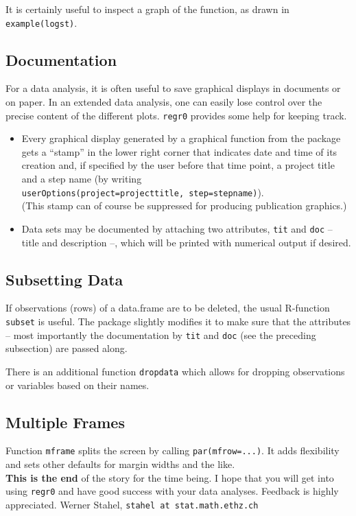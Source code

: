 \documentclass{article}
\providecommand{\T}{\texttt}
\providecommand{\Tit}[1]{\textbf{#1}\hspace{1em}}
\begin{document}
It is certainly useful to inspect a graph of the function, as drawn in 
\texttt{example(logst)}.


\subsection{Documentation}
For a data analysis, it is often useful to save graphical displays in 
documents or on paper. In an extended data analysis, one can easily lose
control over the precise content of the different plots.
\T{regr0} provides some help for keeping track.
\begin{itemize}
\item 
  Every graphical display generated by a graphical function from the
  package gets a ``stamp'' in the lower right corner that indicates date
  and time of its creation and, if specified by the user before that 
  time point, a project title and a step name (by writing\\
  \T{userOptions(project=projecttitle, step=stepname)}).\\
  (This stamp can of course be suppressed for producing publication
  graphics.) 
\item
  Data sets may be documented by attaching two attributes, \T{tit} and 
  \T{doc} -- title and description --, which will be printed with
  numerical output if desired.
\end{itemize}

\subsection{Subsetting Data}
If observations (rows) of a data.frame are to be deleted, the usual
R-function \T{subset} is useful. The package slightly modifies it to make
sure that the attributes -- most importantly the documentation by
\T{tit} and \T{doc} (see the preceding subsection) are passed along.

There is an additional function \T{dropdata} which allows for dropping
observations or variables based on their names.

\subsection{Multiple Frames}
Function \T{mframe} splits the screen by calling \T{par(mfrow=...)}.
It adds flexibility and sets other defaults for margin widths and the like. 
\\[10mm]

{\small
\Tit{This is the end} of the story for the time being. I hope that you will
get into using \T{regr0} and have good success with your data analyses.
Feedback is highly appreciated.
Werner Stahel, \T{stahel at stat.math.ethz.ch}
}
\end{document}
